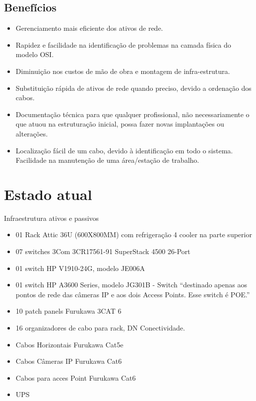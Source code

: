 \documentclass[	DIV=calc,%
paper=a4,%
fontsize=12pt,%
onecolumn]{scrartcl}	 					%
\begin{document}
	\subsection{Benefícios}
	\begin{itemize}
		\item Gerenciamento mais eficiente dos ativos de rede.
		\item Rapidez e facilidade na identificação de problemas na camada física do modelo OSI.
		\item Diminuição nos custos de mão de obra e montagem de infra-estrutura. 
		\item Substituição rápida de ativos de rede quando preciso, devido a ordenação dos cabos. 
		\item Documentação técnica para que qualquer profissional, não necessariamente o que atuou na estruturação inicial, possa fazer novas implantações ou alterações. 
		\item Localização fácil de um cabo, devido à identificação em todo o sistema. Facilidade na manutenção de uma área/estação de trabalho.
	\end{itemize}
	
	\section{Estado atual}
	Infraestrutura ativos e passivos 
	\begin{itemize}
		\item 01 Rack Attic 36U (600X800MM) com refrigeração 4 cooler na parte superior
		\item 07 switches 3Com 3CR17561-91 SuperStack 4500 26-Port
		\item 01 switch HP V1910-24G, modelo JE006A
		\item 01 switch HP A3600 Series, modelo JG301B - Switch “destinado apenas aos pontos de rede das câmeras IP e aos dois Access Points. Esse switch é POE.”
		\item 10 patch panels Furukawa 3CAT 6
		\item 16 organizadores de cabo para rack, DN Conectividade.
		\item Cabos Horizontais Furukawa Cat5e
		\item Cabos Câmeras IP Furukawa Cat6
		\item Cabos para acces Point Furukawa Cat6
		\item UPS 
	\end{itemize}
\end{document}
